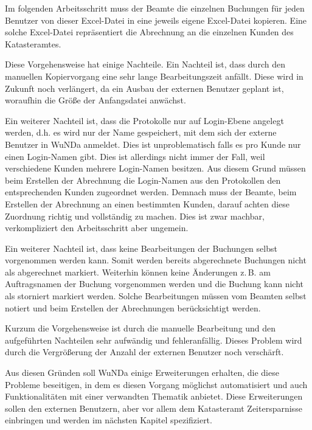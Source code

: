 Im folgenden Arbeitsschritt muss der Beamte die einzelnen Buchungen für jeden Benutzer von dieser Excel-Datei in eine jeweils eigene Excel-Datei kopieren. Eine solche Excel-Datei repräsentiert die Abrechnung an die einzelnen Kunden des Katasteramtes.

Diese Vorgehensweise hat einige Nachteile. Ein Nachteil ist, dass durch den manuellen Kopiervorgang eine sehr lange Bearbeitungszeit anfällt. Diese wird in Zukunft noch verlängert, da ein Ausbau der externen Benutzer geplant ist, woraufhin die Größe der Anfangsdatei anwächst.

Ein weiterer Nachteil ist, dass die Protokolle nur auf Login-Ebene angelegt werden, d.h. es wird nur der Name gespeichert, mit dem sich der externe Benutzer in \ac{WuNDa} anmeldet.
Dies ist unproblematisch falls es pro Kunde nur einen Login-Namen gibt.
Dies ist allerdings nicht immer der Fall, weil verschiedene Kunden mehrere Login-Namen besitzen.
Aus diesem Grund müssen beim Erstellen der Abrechnung die Login-Namen aus den Protokollen den entsprechenden Kunden zugeordnet werden.
Demnach muss der Beamte, beim Erstellen der Abrechnung an einen bestimmten Kunden, darauf achten diese Zuordnung richtig und vollständig zu machen.
Dies ist zwar machbar, verkompliziert den Arbeitsschritt aber ungemein.

\label{subsec:erstellen_abrechnung_storno}
Ein weiterer Nachteil ist, dass keine Bearbeitungen der Buchungen selbst vorgenommen werden kann.
Somit werden bereits abgerechnete Buchungen nicht als abgerechnet markiert.
Weiterhin können keine Änderungen z.\,B. am Auftragsnamen der Buchung vorgenommen werden und die Buchung kann nicht als storniert markiert werden.
Solche Bearbeitungen müssen vom Beamten selbst notiert und beim Erstellen der Abrechnungen berücksichtigt werden.

Kurzum die Vorgehensweise ist durch die manuelle Bearbeitung und den aufgeführten Nachteilen sehr aufwändig und fehleranfällig. Dieses Problem wird durch die Vergrößerung der Anzahl der externen Benutzer noch verschärft.

Aus diesen Gründen soll \ac{WuNDa} einige Erweiterungen erhalten, die diese Probleme beseitigen, in dem es diesen Vorgang möglichst automatisiert und auch Funktionalitäten mit einer verwandten Thematik anbietet. Diese Erweiterungen sollen den externen Benutzern, aber vor allem dem Katasteramt Zeitersparnisse einbringen und werden im nächsten Kapitel spezifiziert.


